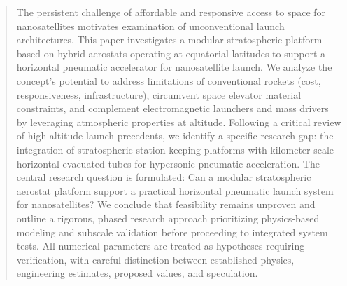 \begin{abstract}
The persistent challenge of affordable and responsive access to space for nanosatellites motivates examination of unconventional launch architectures. This paper investigates a modular stratospheric platform based on hybrid aerostats operating at equatorial latitudes to support a horizontal pneumatic accelerator for nanosatellite launch. We analyze the concept's potential to address limitations of conventional rockets (cost, responsiveness, infrastructure), circumvent space elevator material constraints, and complement electromagnetic launchers and mass drivers by leveraging atmospheric properties at altitude. Following a critical review of high-altitude launch precedents, we identify a specific research gap: the integration of stratospheric station-keeping platforms with kilometer-scale horizontal evacuated tubes for hypersonic pneumatic acceleration. The central research question is formulated: Can a modular stratospheric aerostat platform support a practical horizontal pneumatic launch system for nanosatellites? We conclude that feasibility remains unproven and outline a rigorous, phased research approach prioritizing physics-based modeling and subscale validation before proceeding to integrated system tests. All numerical parameters are treated as hypotheses requiring verification, with careful distinction between established physics, engineering estimates, proposed values, and speculation.
\end{abstract}
